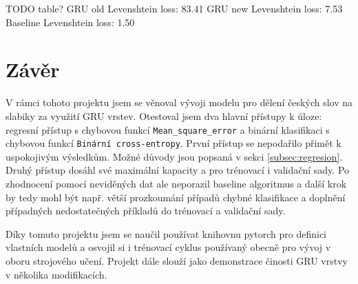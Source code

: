\documentclass[a4paper]{article}
\theoremstyle{definition}
\begin{document}
TODO table?
GRU old Levenshtein loss:  83.41 %
GRU new Levenshtein loss:  7.53 %
Baseline Levenshtein loss: 1.50 %


\section{Závěr}
V rámci tohoto projektu jsem se věnoval vývoji modelu pro dělení českých slov na slabiky za využití GRU vrstev. Otestoval jsem dva hlavní přístupy k úloze: regresní přístup s chybovou funkcí \texttt{Mean\_square\_error} a binární klasifikaci s chybovou funkcí \texttt{Binární cross-entropy}. První přístup se nepodařilo přimět k uspokojivým výsledkům. Možné důvody jsou popsaná v sekci \ref{subsec:regresion}. Druhý přístup dosáhl své maximální kapacity a pro trénovací i validační sady. Po zhodnocení pomocí neviděných dat ale neporazil baseline algoritmus a další krok by tedy mohl být např. větší prozkoumání případů chybné klasifikace a doplnění případných nedostatečných příkladů do trénovací a validační sady.

Díky tomuto projektu jsem se naučil používat knihovnu pytorch pro definici vlastních modelů a osvojil si i trénovací cyklus používaný obecně pro vývoj v oboru strojového učení. Projekt dále slouží jako demonstrace činosti GRU vrstvy v několika modifikacích.
\end{document}
